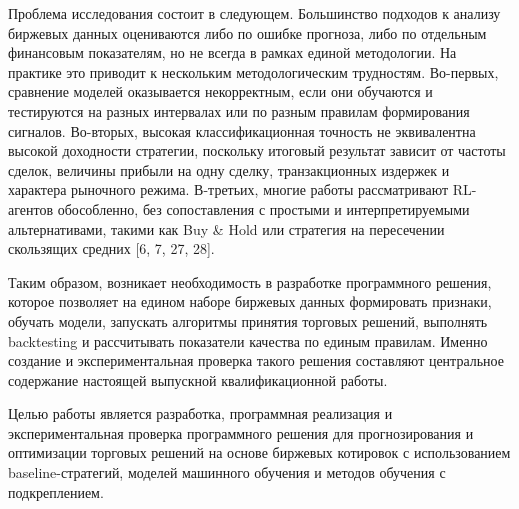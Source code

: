 Проблема исследования состоит в следующем. Большинство подходов к анализу биржевых данных оцениваются либо по ошибке прогноза, либо по отдельным финансовым показателям, но не всегда в рамках единой методологии. На практике это приводит к нескольким методологическим трудностям. Во-первых, сравнение моделей оказывается некорректным, если они обучаются и тестируются на разных интервалах или по разным правилам формирования сигналов. Во-вторых, высокая классификационная точность не эквивалентна высокой доходности стратегии, поскольку итоговый результат зависит от частоты сделок, величины прибыли на одну сделку, транзакционных издержек и характера рыночного режима. В-третьих, многие работы рассматривают RL-агентов обособленно, без сопоставления с простыми и интерпретируемыми альтернативами, такими как Buy \& Hold или стратегия на пересечении скользящих средних [6, 7, 27, 28].

Таким образом, возникает необходимость в разработке программного решения, которое позволяет на едином наборе биржевых данных формировать признаки, обучать модели, запускать алгоритмы принятия торговых решений, выполнять backtesting и рассчитывать показатели качества по единым правилам. Именно создание и экспериментальная проверка такого решения составляют центральное содержание настоящей выпускной квалификационной работы.

Целью работы является разработка, программная реализация и экспериментальная проверка программного решения для прогнозирования и оптимизации торговых решений на основе биржевых котировок с использованием baseline-стратегий, моделей машинного обучения и методов обучения с подкреплением.

